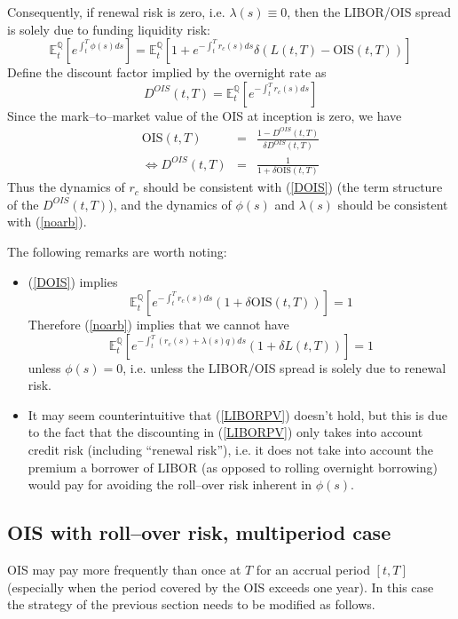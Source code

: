 \documentclass[12pt,a4paper]{article}
\theoremstyle{plain}
\numberwithin{equation}{section}
\begin{document}
Consequently, if renewal risk is zero, i.e. $\lambda(s)\equiv0$, then the LIBOR/OIS spread is solely due to funding liquidity risk:
\begin{equation}\label{oneperiod}
\mathbb{E}_t^\mathbb{Q}\left[e^{\int_{t}^T\phi(s)ds}\right]=
\mathbb{E}_t^\mathbb{Q}\left[1+e^{-\int_t^Tr_c(s)ds}\delta(L(t,T)-\text{OIS}(t,T))\right]
\end{equation}
Define the discount factor implied by the overnight rate as
\begin{equation}\label{DOIScond}
D^{OIS}(t,T)=\mathbb{E}_t^\mathbb{Q}\left[e^{-\int_t^Tr_c(s)ds}\right]
\end{equation}
Since the mark--to--market value of the OIS at inception is zero, we have
\begin{eqnarray}
\text{OIS}(t,T) &=& \frac{1-D^{OIS}(t,T)}{\delta D^{OIS}(t,T)}\\
\Leftrightarrow D^{OIS}(t,T) &=& \frac1{1+\delta\text{OIS}(t,T)}\label{DOIS}
\end{eqnarray}
Thus the dynamics of $r_c$ should be consistent with (\ref{DOIS}) (the term structure of the $D^{OIS}(t,T)$), and the dynamics of $\phi(s)$ and $\lambda(s)$ should be consistent with (\ref{noarb}).

The following remarks are worth noting:
\begin{itemize}
\item (\ref{DOIS}) implies
$$
\mathbb{E}_t^\mathbb{Q}\left[e^{-\int_t^Tr_c(s)ds}(1+\delta \text{OIS}(t,T))\right]=1
$$
Therefore (\ref{noarb}) implies that we cannot have
\begin{equation}\label{LIBORPV}
\mathbb{E}_t^\mathbb{Q}\left[e^{-\int_{t}^T(r_c(s)+\lambda(s)q)ds}(1+\delta L(t,T))\right]=1
\end{equation}
unless $\phi(s)=0$, i.e. unless the LIBOR/OIS spread is solely due to renewal risk.
\item It may seem counterintuitive that (\ref{LIBORPV}) doesn't hold, but this is due to the fact that the discounting in (\ref{LIBORPV}) only takes into account credit risk (including ``renewal risk''), i.e. it does not take into account the premium a borrower of LIBOR (as opposed to rolling overnight borrowing) would pay for avoiding the roll--over risk inherent in $\phi(s)$.
\end{itemize}

\subsection{OIS with roll--over risk, multiperiod case}
OIS may pay more frequently than once at $T$ for an accrual period $[t,T]$ (especially when the period covered by the OIS exceeds one year). In this case the strategy of the previous section needs to be modified as follows.
\end{document}
